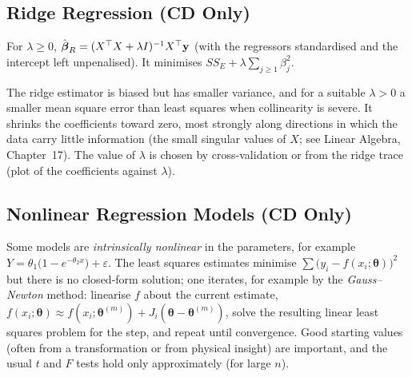 \subsection{Ridge Regression (CD Only)}

\begin{definition}
For $\lambda\ge0$, $\hat{\boldsymbol\beta}_R=(X^{\top} X+\lambda I)^{-1}X^{\top}\mathbf{y}$ (with the regressors standardised and the intercept left unpenalised). It minimises $SS_E+\lambda\sum_{j\ge1}\beta_j^2$.
\end{definition}

The ridge estimator is biased but has smaller variance, and for a suitable $\lambda>0$ a smaller mean square error than least squares when collinearity is severe. It shrinks the coefficients toward zero, most strongly along directions in which the data carry little information (the small singular values of $X$; see Linear Algebra, Chapter~17). The value of $\lambda$ is chosen by cross-validation or from the ridge trace (plot of the coefficients against $\lambda$).

\subsection{Nonlinear Regression Models (CD Only)}

Some models are \emph{intrinsically nonlinear} in the parameters, for example $Y=\theta_1\big(1-e^{-\theta_2x}\big)+\varepsilon$. The least squares estimates minimise $\sum\big(y_i-f(x_i;\boldsymbol\theta)\big)^2$ but there is no closed-form solution; one iterates, for example by the \emph{Gauss--Newton} method: linearise $f$ about the current estimate, $f(x_i;\boldsymbol\theta)\approx f(x_i;\boldsymbol\theta^{(m)})+J_i(\boldsymbol\theta-\boldsymbol\theta^{(m)})$, solve the resulting linear least squares problem for the step, and repeat until convergence. Good starting values (often from a transformation or from physical insight) are important, and the usual $t$ and $F$ tests hold only approximately (for large $n$).

